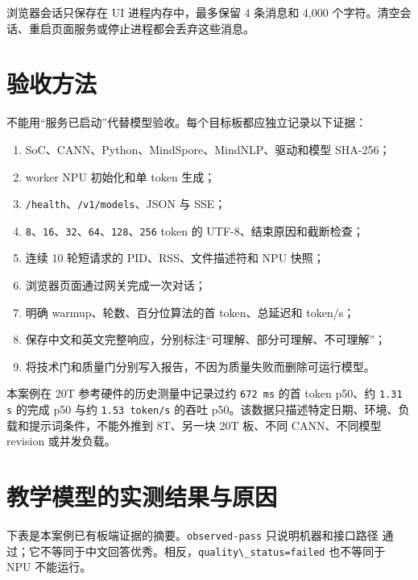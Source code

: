 浏览器会话只保存在 UI 进程内存中，最多保留 4 条消息和 4,000
个字符。清空会话、重启页面服务或停止进程都会丢弃这些消息。

\section{验收方法}\label{ux9a8cux6536ux65b9ux6cd5}

不能用``服务已启动''代替模型验收。每个目标板都应独立记录以下证据：

\begin{enumerate}
\def\labelenumi{\arabic{enumi}.}
\tightlist
\item
  SoC、CANN、Python、MindSpore、MindNLP、驱动和模型 SHA-256；
\item
  worker NPU 初始化和单 token 生成；
\item
  \passthrough{\lstinline!/health!}、\passthrough{\lstinline!/v1/models!}、JSON
  与 SSE；
\item
  \passthrough{\lstinline!8!}、\passthrough{\lstinline!16!}、\passthrough{\lstinline!32!}、\passthrough{\lstinline!64!}、\passthrough{\lstinline!128!}、\passthrough{\lstinline!256!}
  token 的 UTF-8、结束原因和截断检查；
\item
  连续 10 轮短请求的 PID、RSS、文件描述符和 NPU 快照；
\item
  浏览器页面通过网关完成一次对话；
\item
  明确 warmup、轮数、百分位算法的首 token、总延迟和 token/s；
\item
  保存中文和英文完整响应，分别标注``可理解、部分可理解、不可理解''；
\item
  将技术门和质量门分别写入报告，不因为质量失败而删除可运行模型。
\end{enumerate}

本案例在 20T 参考硬件的历史测量中记录过约
\passthrough{\lstinline!672 ms!} 的首 token p50、约
\passthrough{\lstinline!1.31 s!} 的完成 p50 与约
\passthrough{\lstinline!1.53 token/s!} 的吞吐
p50。该数据只描述特定日期、环境、负载和提示词条件，不能外推到 8T、另一块
20T 板、不同 CANN、不同模型 revision 或并发负载。

\section{教学模型的实测结果与原因}\label{ux6559ux5b66ux6a21ux578bux7684ux5b9eux6d4bux7ed3ux679cux4e0eux539fux56e0}

下表是本案例已有板端证据的摘要。\passthrough{\lstinline!observed-pass!}
只说明机器和接口路径
通过；它不等同于中文回答优秀。相反，\passthrough{\lstinline!quality\_status=failed!}
也不等同于 NPU 不能运行。

